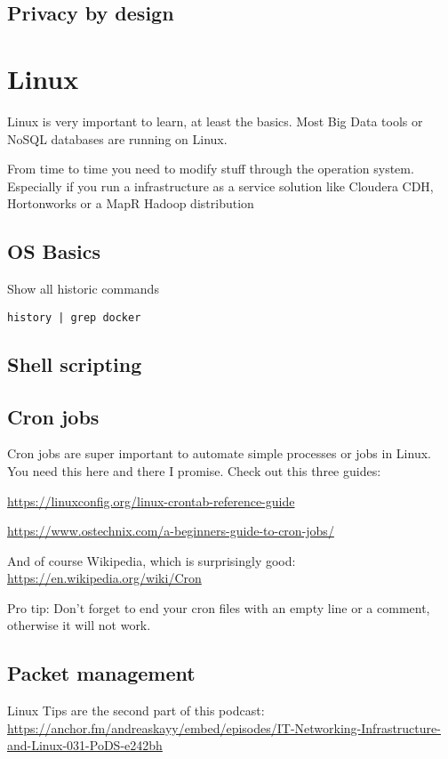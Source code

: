 \documentclass[12pt, numbers=noenddot]{scrreprt} %
\begin{document}
\section{Privacy by design}

\chapter{Linux}

Linux is very important to learn, at least the basics. Most Big Data tools or NoSQL databases are running on Linux. 

From time to time you need to modify stuff through the operation system. Especially if you run a infrastructure as a service solution like Cloudera CDH, Hortonworks or a MapR Hadoop distribution

\section{OS Basics}

Show all historic commands
\begin{lstlisting}
history | grep docker
\end{lstlisting}

\section{Shell scripting}

\section{Cron jobs}

Cron jobs are super important to automate simple processes or jobs in Linux. You need this here and there I promise.
Check out this three guides:

\url{https://linuxconfig.org/linux-crontab-reference-guide}

\url{https://www.ostechnix.com/a-beginners-guide-to-cron-jobs/}

And of course Wikipedia, which is surprisingly good: \url{https://en.wikipedia.org/wiki/Cron}

Pro tip: Don't forget to end your cron files with an empty line or a comment, otherwise it will not work.

\section{Packet management}
Linux Tips are the second part of this podcast: \url{https://anchor.fm/andreaskayy/embed/episodes/IT-Networking-Infrastructure-and-Linux-031-PoDS-e242bh}
\end{document}
